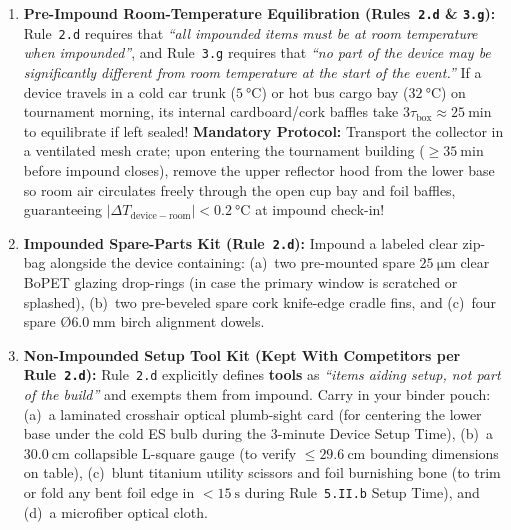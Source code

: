 \begin{devicebox}
\begin{enumerate}
  \item \textbf{Pre-Impound Room-Temperature Equilibration (Rules~\texttt{2.d} \& \texttt{3.g}):} Rule~\texttt{2.d} requires that \textit{``all impounded items must be at room temperature when impounded''}, and Rule~\texttt{3.g} requires that \textit{``no part of the device may be significantly different from room temperature at the start of the event.''} If a device travels in a cold car trunk ($\SI{5}{\celsius}$) or hot bus cargo bay ($\SI{32}{\celsius}$) on tournament morning, its internal cardboard/cork baffles take $3\tau_{\mathrm{box}} \approx \SI{25}{\minute}$ to equilibrate if left sealed! \textbf{Mandatory Protocol:} Transport the collector in a ventilated mesh crate; upon entering the tournament building ($\ge\SI{35}{\minute}$ before impound closes), remove the upper reflector hood from the lower base so room air circulates freely through the open cup bay and foil baffles, guaranteeing $|\Delta T_{\mathrm{device-room}}| < \SI{0.2}{\celsius}$ at impound check-in!
  \item \textbf{Impounded Spare-Parts Kit (Rule~\texttt{2.d}):} Impound a labeled clear zip-bag alongside the device containing: (a)~two pre-mounted spare $\SI{25}{\micro\meter}$ clear BoPET glazing drop-rings (in case the primary window is scratched or splashed), (b)~two pre-beveled spare cork knife-edge cradle fins, and (c)~four spare $\text{\O}\SI{6.0}{\milli\meter}$ birch alignment dowels.
  \item \textbf{Non-Impounded Setup Tool Kit (Kept With Competitors per Rule~\texttt{2.d}):} Rule~\texttt{2.d} explicitly defines \textbf{tools} as \textit{``items aiding setup, not part of the build''} and exempts them from impound. Carry in your binder pouch: (a)~a laminated crosshair optical plumb-sight card (for centering the lower base under the cold ES bulb during the 3-minute Device Setup Time), (b)~a $\SI{30.0}{\centi\meter}$ collapsible L-square gauge (to verify $\le\SI{29.6}{\centi\meter}$ bounding dimensions on table), (c)~blunt titanium utility scissors and foil burnishing bone (to trim or fold any bent foil edge in $<\SI{15}{\second}$ during Rule~\texttt{5.II.b} Setup Time), and (d)~a microfiber optical cloth.
\end{enumerate}
\end{devicebox}

